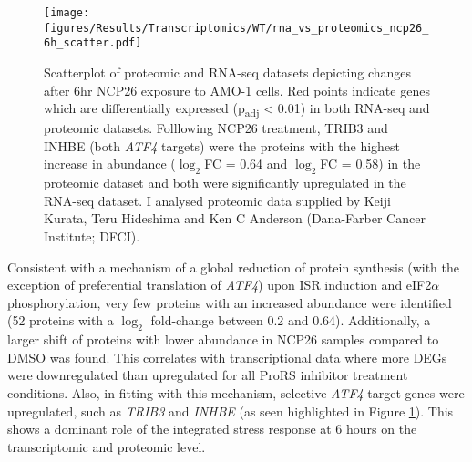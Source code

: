 \begin{figure}[htb]
\centering
\texttt{[image: figures/Results/Transcriptomics/WT/rna\_vs\_proteomics\_ncp26\_6h\_scatter.pdf]}
\caption[Proteomics vs RNA-seq scatterplot- WT cells]{Scatterplot of proteomic and RNA-seq datasets depicting changes after 6hr NCP26 exposure to AMO-1 cells.
Red points indicate genes which are differentially expressed (p\textsubscript{adj} < 0.01) in both RNA-seq and proteomic datasets.
Folllowing NCP26 treatment, TRIB3 and INHBE (both \textit{ATF4} targets) were the proteins with the highest increase in abundance ($\log_{2}$FC = 0.64 and $\log_{2}$FC = 0.58) in the proteomic dataset and both were significantly upregulated in the RNA-seq dataset.
I analysed proteomic data supplied by Keiji Kurata, Teru Hideshima and Ken C Anderson (Dana-Farber Cancer Institute; DFCI).
}
\label{fig:proteomic_rna_scatter}
\end{figure}
%
Consistent with a mechanism of a global reduction of protein synthesis (with the exception of preferential translation of \textit{ATF4}) upon  ISR induction and eIF2$\alpha$ phosphorylation, very few proteins with an increased abundance were identified (52 proteins with a $\log_{2}$ fold-change between 0.2 and 0.64).
Additionally, a larger shift of proteins with lower abundance in NCP26 samples compared to DMSO was found.
This correlates with transcriptional data where more DEGs were downregulated than upregulated for all ProRS inhibitor treatment conditions.
Also, in-fitting with this mechanism, selective \textit{ATF4} target genes were upregulated, such as \textit{TRIB3} and \textit{INHBE} (as seen highlighted in Figure \ref{fig:proteomic_rna_scatter}).
This shows a dominant role of the integrated stress response at 6 hours on the transcriptomic and proteomic level.



